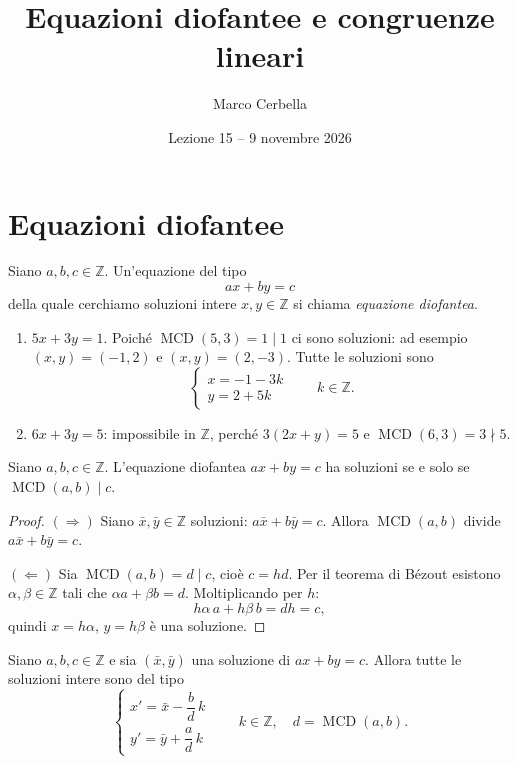 \documentclass[11pt,a4paper]{article}
\title{Equazioni diofantee e congruenze lineari}
\author{Marco Cerbella}
\date{Lezione 15 -- 9 novembre 2026}
\begin{document}
\maketitle

\section{Equazioni diofantee}

\begin{definizione}
Siano $a, b, c \in \mathbb{Z}$. Un'equazione del tipo
\[
  ax + by = c
\]
della quale cerchiamo soluzioni intere $x, y \in \mathbb{Z}$ si chiama \emph{equazione diofantea}.
\end{definizione}

\begin{esempio}
\begin{enumerate}
  \item $5x + 3y = 1$. Poiché $\operatorname{MCD}(5, 3) = 1 \mid 1$ ci sono soluzioni: ad esempio $(x, y) = (-1, 2)$ e $(x, y) = (2, -3)$. Tutte le soluzioni sono
  \[
    \begin{cases} x = -1 - 3k \\ y = 2 + 5k \end{cases} \qquad k \in \mathbb{Z}.
  \]
  \item $6x + 3y = 5$: impossibile in $\mathbb{Z}$, perché $3(2x + y) = 5$ e $\operatorname{MCD}(6, 3) = 3 \nmid 5$.
\end{enumerate}
\end{esempio}

\begin{proposizione}
Siano $a, b, c \in \mathbb{Z}$. L'equazione diofantea $ax + by = c$ ha soluzioni se e solo se $\operatorname{MCD}(a, b) \mid c$.
\end{proposizione}

\begin{proof}
$(\Rightarrow)$ Siano $\bar{x}, \bar{y} \in \mathbb{Z}$ soluzioni: $a\bar{x} + b\bar{y} = c$. Allora $\operatorname{MCD}(a, b)$ divide $a\bar{x} + b\bar{y} = c$.

$(\Leftarrow)$ Sia $\operatorname{MCD}(a, b) = d \mid c$, cioè $c = hd$. Per il teorema di Bézout esistono $\alpha, \beta \in \mathbb{Z}$ tali che $\alpha a + \beta b = d$. Moltiplicando per $h$:
\[
  h\alpha\, a + h\beta\, b = dh = c,
\]
quindi $x = h\alpha$, $y = h\beta$ è una soluzione. \qedhere
\end{proof}

\begin{proposizione}
Siano $a, b, c \in \mathbb{Z}$ e sia $(\bar{x}, \bar{y})$ una soluzione di $ax + by = c$. Allora tutte le soluzioni intere sono del tipo
\[
  \begin{cases} x' = \bar{x} - \dfrac{b}{d}\,k \\[2mm] y' = \bar{y} + \dfrac{a}{d}\,k \end{cases} \qquad k \in \mathbb{Z}, \quad d = \operatorname{MCD}(a, b).
\]
\end{proposizione}
\end{document}
